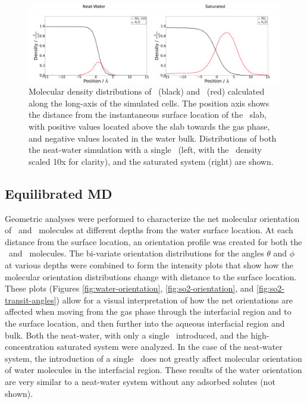 \documentclass{article}
\begin{document}
\begin{figure}[h!]
	\begin{center}
		\includegraphics[scale=1.0]{density.png}
		\caption{Molecular density distributions of \wat~(black) and \suldiox~(red) calculated along the long-axis of the simulated cells. The position axis shows the distance from the instantaneous surface location of the \wat~slab, with positive values located above the slab towards the gas phase, and negative values located in the water bulk. Distributions of both the neat-water simulation with a single \suldiox~(left, with the \suldiox~density scaled 10x for clarity), and the saturated system (right) are shown.}
		\label{fig:density}
	\end{center}
\end{figure}

\subsection{Equilibrated MD}

Geometric analyses were performed to characterize the net molecular orientation of \wat~and \suldiox~molecules at different depths from the water surface location. At each distance from the surface location, an orientation profile was created for both the \wat~and \suldiox~molecules. The bi-variate orientation distributions for the angles $\theta$ and $\phi$ at various depths were combined to form the intensity plots that show how the molecular orientation distributions change with distance to the surface location. These plots (Figures \ref{fig:water-orientation}, \ref{fig:so2-orientation}, and \ref{fig:so2-transit-angles}) allow for a visual interpretation of how the net orientations are affected when moving from the gas phase through the interfacial region and to the surface location, and then further into the aqueous interfacial region and bulk. Both the neat-water, with only a single \suldiox~introduced, and the high-concentration saturated system were analyzed. In the case of the neat-water system, the introduction of a single \suldiox~does not greatly affect molecular orientation of water molecules in the interfacial region. These results of the water orientation are very similar to a neat-water system without any adsorbed solutes (not shown).
\end{document}
